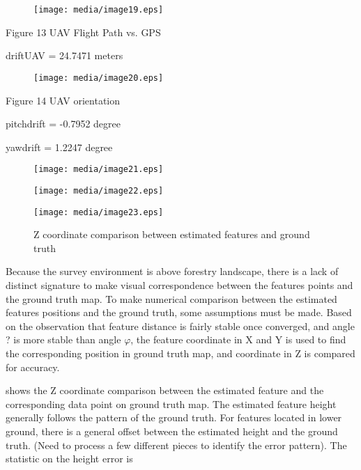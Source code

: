 \begin{figure}[h]
\centering
\texttt{[image: media/image19.eps]}
\end{figure}


\begin{center}Figure 13 UAV Flight Path vs. GPS\end{center}

driftUAV = 24.7471 meters

\begin{figure}[h]
\centering
\texttt{[image: media/image20.eps]}
\end{figure}


\begin{center}Figure 14 UAV orientation\end{center}

pitchdrift = -0.7952 degree

yawdrift = 1.2247 degree

\begin{figure}[h]
\centering
\texttt{[image: media/image21.eps]}
\end{figure}


\begin{figure}[h]
\centering
\texttt{[image: media/image22.eps]}
\end{figure}


\begin{figure}[h]
\centering
\texttt{[image: media/image23.eps]}
\caption{\label{figure:_Ref349487278} Z coordinate comparison between 
estimated features and ground truth}
\end{figure}



Because the survey environment is above forestry landscape, there is a 
lack of distinct signature to make visual correspondence between the 
features points and the ground truth map. To make numerical comparison 
between the estimated features positions and the ground truth, some 
assumptions must be made. Based on the observation that feature distance 
is fairly stable once converged, and angle ? is more stable than angle $
\varphi $, the feature coordinate in X and Y is used to find the 
corresponding position in ground truth map, and coordinate in Z is 
compared for accuracy. 

 shows the Z coordinate comparison between the estimated feature and the 
corresponding data point on ground truth map. The estimated feature 
height generally follows the pattern of the ground truth. For features 
located in lower ground, there is a general offset between the estimated 
height and the ground truth. (Need to process a few different pieces to 
identify the error pattern). The statistic on the height error is


